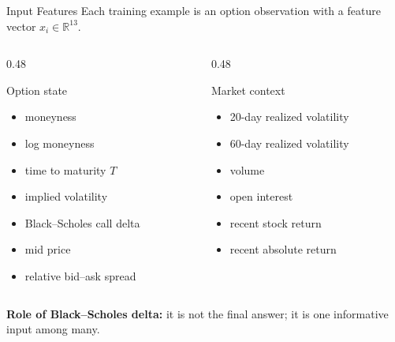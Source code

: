 \documentclass[aspectratio=169,11pt]{beamer}
\begin{document}
\begin{frame}{Input Features}
Each training example is an option observation with a feature vector
\(
  x_i \in \mathbb{R}^{13}.
\)

\begin{columns}[T,onlytextwidth]
\begin{column}{0.48\textwidth}
\begin{block}{Option state}
\begin{itemize}
  \item moneyness
  \item log moneyness
  \item time to maturity $T$
  \item implied volatility
  \item Black--Scholes call delta
  \item mid price
  \item relative bid--ask spread
\end{itemize}
\end{block}
\end{column}
\begin{column}{0.48\textwidth}
\begin{block}{Market context}
\begin{itemize}
  \item 20-day realized volatility
  \item 60-day realized volatility
  \item volume
  \item open interest
  \item recent stock return
  \item recent absolute return
\end{itemize}
\end{block}
\end{column}
\end{columns}

\vspace{0.6cm}
\textbf{Role of Black--Scholes delta:} it is not the final answer; it is one informative input among many.
\end{frame}
\end{document}
